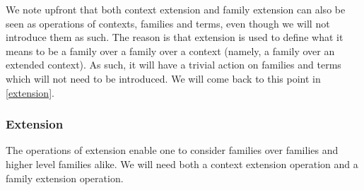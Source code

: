 \begin{comment}
Generally, 
each operation should
have an action on contexts, on families and on terms at the `appropriate level'
and should be compatible with each of the operations we introduce here. In
that will become more practical after the theory of contexts, families and terms
is formulated, this means that when we will write down a type theory that
interprets itself in \autoref{ttmodels}, each of the notions of
extension, empty family, weakening, substitution and identity terms are going to be internalized
as terms of the theory and all terms are going to be compatible with these.
That vague idea will be our guiding light.

So in principle, the introductions of each of the empty context, extension,
weakening, substitution and identity terms should come in three parts. In 
practice, they do not all come in three parts.

Apart from the empty context, there will indeed be an empty family and a term
of the empty family (which will be deemed unique). But extension will
not have an explicit action `at the level of families' since extension
is used to define higher families and the action would have to be trivial
anyway. The empty context and extension provide the essentials of the rest of
the theory in the sense that higher families are families over extensions,
contexts are families over the empty context and the `action on families' of
any operation applied to families over the empty context is the same as the
original operation. Thus, when we have introduced the operations of weakening
and substitution we will see that they also have an `action on the terms of 
contexts'. We will state the relevant judgmental equality rules for the empty
context in this section rather than in the next, since they are required to
state that the action on families of an operation is compatible with the
original operation.
\end{comment}

We note upfront that both context extension and family extension can also be
seen as operations of contexts, families and terms, even though we will not
introduce them as such. The reason is that extension is used to define what it
means to be a family over a family over a context (namely, a family over an
extended context). As such, it will have a trivial action on families and terms
which will not need to be introduced. We will come back to this point in
\autoref{extension}.

\subsubsection{Extension}
\label{extension}
The operations of extension enable one to consider families over
families and higher level families alike. We will need both a context extension
operation and a family extension operation.

